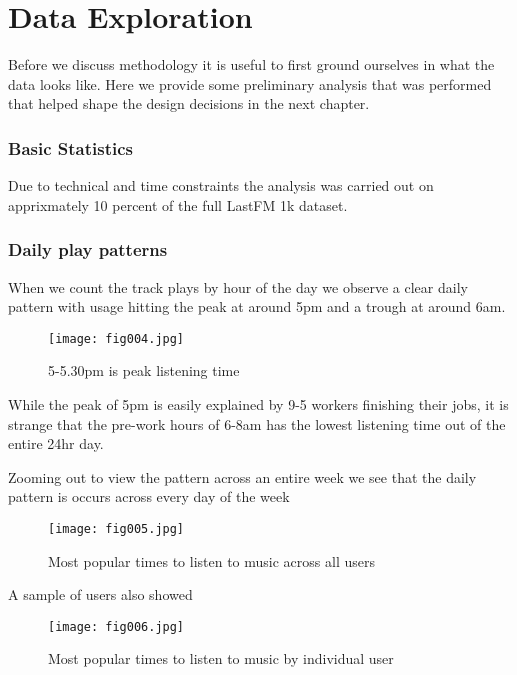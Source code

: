 
\chapter{Data Exploration} %

Before we discuss methodology it is useful to first ground ourselves in what the data looks like. Here we provide some preliminary analysis that was performed that helped shape the design decisions in the next chapter.

\label{Chapter3}

\subsection{Basic Statistics}

Due to technical and time constraints the analysis was carried out on apprixmately 10 percent of the full LastFM 1k dataset.


\subsection{Daily play patterns}

When we count the track plays by hour of the day we observe a clear daily pattern with usage hitting the peak at around 5pm and a trough at around 6am. 

\begin{figure}[h!]
	\centering
	\texttt{[image: fig004.jpg]}
	\caption{5-5.30pm is peak listening time}
	\label{fig:fig4}
\end{figure} 

While the peak of 5pm is easily explained by 9-5 workers finishing their jobs, it is strange that the pre-work hours of 6-8am has the lowest listening time out of the entire 24hr day.

Zooming out to view the pattern across an entire week we see that the daily pattern is occurs across every day of the week

\begin{figure}[h!]
	\centering
	\texttt{[image: fig005.jpg]}
	\caption{Most popular times to listen to music across all users}
	\label{fig:fig5}
\end{figure} 


A sample of users also showed 

\begin{figure}[h!]
	\centering
	\texttt{[image: fig006.jpg]}
	\caption{Most popular times to listen to music by individual user}
	\label{fig:fig6}
\end{figure} 

